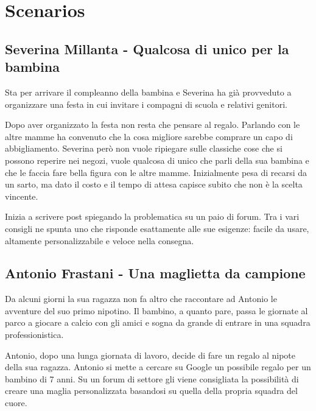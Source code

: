 \documentclass[12pt,italian,]{report}
\begin{document}
\hypertarget{scenarios}{%
\section{Scenarios}\label{scenarios}}

\hypertarget{severina-millanta---qualcosa-di-unico-per-la-bambina}{%
\subsection{Severina Millanta - Qualcosa di unico per la
bambina}\label{severina-millanta---qualcosa-di-unico-per-la-bambina}}

Sta per arrivare il compleanno della bambina e Severina ha già
provveduto a organizzare una festa in cui invitare i compagni di scuola
e relativi genitori.

Dopo aver organizzato la festa non resta che pensare al regalo. Parlando
con le altre mamme ha convenuto che la cosa migliore sarebbe comprare un
capo di abbigliamento. Severina però non vuole ripiegare sulle classiche
cose che si possono reperire nei negozi, vuole qualcosa di unico che
parli della sua bambina e che le faccia fare bella figura con le altre
mamme. Inizialmente pesa di recarsi da un sarto, ma dato il costo e il
tempo di attesa capisce subito che non è la scelta vincente.

Inizia a scrivere post spiegando la problematica su un paio di forum.
Tra i vari consigli ne spunta uno che risponde esattamente alle sue
esigenze: facile da usare, altamente personalizzabile e veloce nella
consegna.

\hypertarget{antonio-frastani---una-maglietta-da-campione}{%
\subsection{Antonio Frastani - Una maglietta da
campione}\label{antonio-frastani---una-maglietta-da-campione}}

Da alcuni giorni la sua ragazza non fa altro che raccontare ad Antonio
le avventure del suo primo nipotino. Il bambino, a quanto pare, passa le
giornate al parco a giocare a calcio con gli amici e sogna da grande di
entrare in una squadra professionistica.

Antonio, dopo una lunga giornata di lavoro, decide di fare un regalo al
nipote della sua ragazza. Antonio si mette a cercare su Google un
possibile regalo per un bambino di 7 anni. Su un forum di settore gli
viene consigliata la possibilità di creare una maglia personalizzata
basandosi su quella della propria squadra del cuore.
\end{document}
